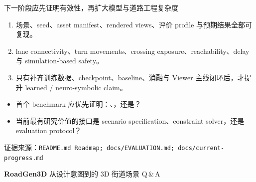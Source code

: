 \documentclass[aspectratio=169,10pt]{ctexbeamer}
\newcommand{\sourcefoot}[1]{\vfill{\scriptsize\color{hkustgrey}证据来源：\texttt{#1}}}
\begin{document}
\begin{frame}{下一阶段应先证明有效性，再扩大模型与道路工程复杂度}
  \begin{enumerate}
    \item {}\par
      场景、seed、asset manifest、rendered views、评价 profile 与预期结果全部可复现。
    \item {}\par
      lane connectivity、turn movements、crossing exposure、reachability、delay 与 simulation-based safety。
    \item {}\par
      只有补齐训练数据、checkpoint、baseline、消融与 Viewer 主线闭环后，才提升 learned / neuro-symbolic claim。
  \end{enumerate}
  \deckgap
  \begin{callout}[希望老师重点反馈]
    \begin{itemize}
      \item 首个 benchmark 应优先证明：、，还是？
      \item 当前最有研究价值的接口是 scenario specification、constraint solver，还是 evaluation protocol？
    \end{itemize}
  \end{callout}
  \sourcefoot{README.md Roadmap; docs/EVALUATION.md; docs/current-progress.md}
\end{frame}

\begin{frame}[plain,c]
  \centering
  {\fontsize{38}{42}\selectfont\bfseries\color{hkustblue} RoadGen3D}
  \deckgap
  {\Large 从设计意图到的 3D 街道场景}
  \deckgap
  {\large\color{hkustgrey}Q\,\&\,A}
\end{frame}

\appendix
\end{document}
